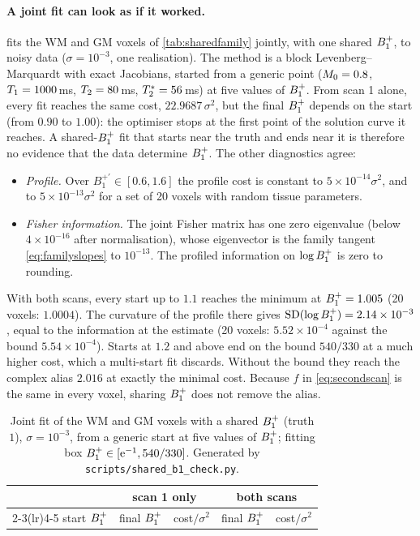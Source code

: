 \paragraph{A joint fit can look as if it worked.}  fits the WM and GM voxels of
\cref{tab:sharedfamily} jointly, with one shared $B_1^{+}$, to noisy data ($\sigma=10^{-3}$, one
realisation). The method is a block Levenberg--Marquardt with exact Jacobians, started from a
generic point ($M_0=0.8$, $T_1=1000$\,ms, $T_2=80$\,ms, $T_2^{*}=56$\,ms) at five values of $B_1^{+}$. From
scan 1 alone, every fit reaches the same cost, $22.9687\,\sigma^2$, but the final $B_1^{+}$ depends on the
start (from $0.90$ to $1.00$): the optimiser stops at the first point of the solution curve it
reaches. A shared-$B_1^{+}$ fit that starts near the truth and ends near it is therefore no
evidence that the data determine $B_1^{+}$. The other diagnostics agree:
\begin{itemize}
\item \emph{Profile.} Over $B_1^{+\prime}\in[0.6,1.6]$ the profile cost is constant to $5\times10^{-14}\sigma^2$, and to
  $5\times10^{-13}\sigma^2$ for a set of 20 voxels with random tissue parameters.
\item \emph{Fisher information.} The joint Fisher matrix has one zero eigenvalue (below
  $4\times10^{-16}$ after normalisation), whose eigenvector is the family tangent
  \eqref{eq:familyslopes} to $10^{-13}$. The profiled information on $\log B_1^{+}$ is zero to rounding.
\end{itemize}
With both scans, every start up to $1.1$ reaches the minimum at $B_1^{+}=1.005$ (20 voxels: $1.0004$).
The curvature of the profile there gives $\mathrm{SD}(\log B_1^{+})=2.14\times10^{-3}$, equal to the
information at the estimate (20 voxels: $5.52\times10^{-4}$ against the bound $5.54\times10^{-4}$). Starts at
$1.2$ and above end on the bound $540/330$ at a much higher cost, which a multi-start fit discards.
Without the bound they reach the complex alias $2.016$ at exactly the minimal cost. Because
$f$ in \eqref{eq:secondscan} is the same in every voxel, sharing $B_1^{+}$ does not remove the alias.

\begin{table}[!htbp]
\centering
\caption{Joint fit of the WM and GM voxels with a shared $B_1^{+}$ (truth $1$), $\sigma=10^{-3}$, from a
generic start at five values of $B_1^{+}$; fitting box $B_1^{+}\in[\mathrm{e}^{-1},540/330]$. Generated by
\texttt{scripts/shared\_b1\_check.py}.}
\label{tab:sharedfit}
\small
\begin{tabular}{ccccc}
\toprule
& \multicolumn{2}{c}{scan 1 only} & \multicolumn{2}{c}{both scans}\\
\cmidrule(lr){2-3}\cmidrule(lr){4-5}
start $B_1^{+}$ & final $B_1^{+}$ & cost$/\sigma^2$ & final $B_1^{+}$ & cost$/\sigma^2$\\
\midrule

\bottomrule
\end{tabular}
\end{table}

